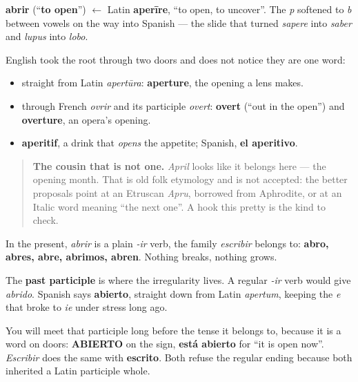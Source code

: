 \begin{cousinweb}
\textbf{abrir} (\textquotedblleft{}\textbf{to open}\textquotedblright{}) $\leftarrow$ Latin \textbf{aperīre}, \textquotedblleft{}to open, to uncover\textquotedblright{}. The \emph{p} softened to \emph{b} between vowels on the way into Spanish — the slide that turned \emph{sapere} into \emph{saber} and \emph{lupus} into \emph{lobo}.

English took the root through two doors and does not notice they are one word:

\begin{itemize}
\raggedright
  \item straight from Latin \emph{apertūra}: \textbf{aperture}, the opening a lens makes.
  \item through French \emph{ovrir} and its participle \emph{overt}: \textbf{overt} (\textquotedblleft{}out in the open\textquotedblright{}) and \textbf{overture}, an opera's opening.
  \item \textbf{aperitif}, a drink that \emph{opens} the appetite; Spanish, \textbf{el aperitivo}.
\end{itemize}

\begin{quote}
\textbf{The cousin that is not one.} \emph{April} looks like it belongs here — the opening month. That is old folk etymology and is not accepted: the better proposals point at an Etruscan \emph{Apru}, borrowed from Aphrodite, or at an Italic word meaning \textquotedblleft{}the next one\textquotedblright{}. A hook this pretty is the kind to check.
\end{quote}
\end{cousinweb}

\begin{grammarlens}[title={Grammar Lens: regular everywhere but the participle}]
In the present, \emph{abrir} is a plain \emph{-ir} verb, the family \emph{escribir} belongs to: \textbf{abro, abres, abre, abrimos, abren}. Nothing breaks, nothing grows.

The \textbf{past participle} is where the irregularity lives. A regular \emph{-ir} verb would give \emph{abrido}. Spanish says \textbf{abierto}, straight down from Latin \emph{apertum}, keeping the \emph{e} that broke to \emph{ie} under stress long ago.

You will meet that participle long before the tense it belongs to, because it is a word on doors: \textbf{ABIERTO} on the sign, \textbf{está abierto} for \textquotedblleft{}it is open now\textquotedblright{}. \emph{Escribir} does the same with \textbf{escrito}. Both refuse the regular ending because both inherited a Latin participle whole.
\end{grammarlens}

